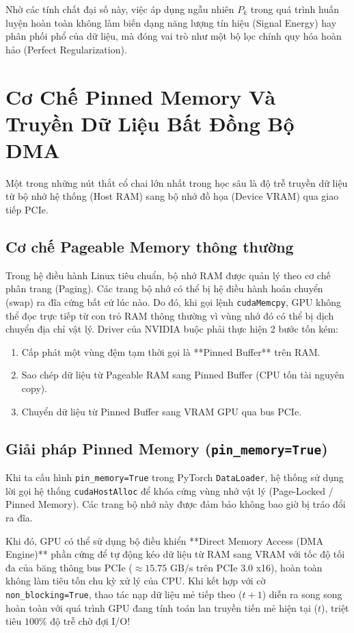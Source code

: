 \documentclass[11pt,a4paper]{report}
\begin{document}
Nhờ các tính chất đại số này, việc áp dụng ngẫu nhiên $P_k$ trong quá trình huấn luyện hoàn toàn không làm biến dạng năng lượng tín hiệu (Signal Energy) hay phân phối phổ của dữ liệu, mà đóng vai trò như một bộ lọc chính quy hóa hoàn hảo (Perfect Regularization).

\section{Cơ Chế Pinned Memory Và Truyền Dữ Liệu Bất Đồng Bộ DMA}

Một trong những nút thắt cổ chai lớn nhất trong học sâu là độ trễ truyền dữ liệu từ bộ nhớ hệ thống (Host RAM) sang bộ nhớ đồ họa (Device VRAM) qua giao tiếp PCIe.

\subsection{Cơ chế Pageable Memory thông thường}
Trong hệ điều hành Linux tiêu chuẩn, bộ nhớ RAM được quản lý theo cơ chế phân trang (Paging). Các trang bộ nhớ có thể bị hệ điều hành hoán chuyển (swap) ra đĩa cứng bất cứ lúc nào. Do đó, khi gọi lệnh \texttt{cudaMemcpy}, GPU không thể đọc trực tiếp từ con trỏ RAM thông thường vì vùng nhớ đó có thể bị dịch chuyển địa chỉ vật lý. Driver của NVIDIA buộc phải thực hiện 2 bước tốn kém:
\begin{enumerate}
    \item Cấp phát một vùng đệm tạm thời gọi là **Pinned Buffer** trên RAM.
    \item Sao chép dữ liệu từ Pageable RAM sang Pinned Buffer (CPU tốn tài nguyên copy).
    \item Chuyển dữ liệu từ Pinned Buffer sang VRAM GPU qua bus PCIe.
\end{enumerate}

\subsection{Giải pháp Pinned Memory (\texttt{pin\_memory=True})}
Khi ta cấu hình \texttt{pin\_memory=True} trong PyTorch \texttt{DataLoader}, hệ thống sử dụng lời gọi hệ thống \texttt{cudaHostAlloc} để khóa cứng vùng nhớ vật lý (Page-Locked / Pinned Memory). Các trang bộ nhớ này được đảm bảo không bao giờ bị tráo đổi ra đĩa.

Khi đó, GPU có thể sử dụng bộ điều khiển **Direct Memory Access (DMA Engine)** phần cứng để tự động kéo dữ liệu từ RAM sang VRAM với tốc độ tối đa của băng thông bus PCIe ($\approx 15.75\text{ GB/s}$ trên PCIe 3.0 x16), hoàn toàn không làm tiêu tốn chu kỳ xử lý của CPU. Khi kết hợp với cờ \texttt{non\_blocking=True}, thao tác nạp dữ liệu mẻ tiếp theo ($t+1$) diễn ra song song hoàn toàn với quá trình GPU đang tính toán lan truyền tiến mẻ hiện tại ($t$), triệt tiêu $100\%$ độ trễ chờ đợi I/O!
\end{document}
